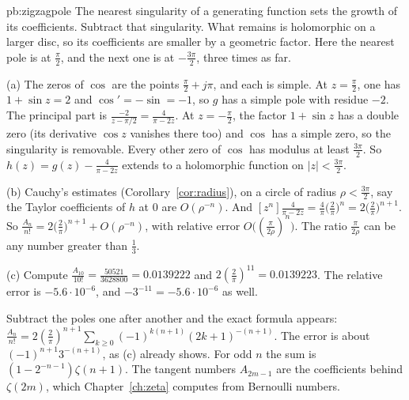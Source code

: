 \begin{solution}{pb:zigzagpole}
\idea The nearest singularity of a generating function sets the growth of its coefficients. Subtract that singularity. What remains is holomorphic on a larger disc, so its coefficients are smaller by a geometric factor. Here the nearest pole is at $\frac\pi2$, and the next one is at $-\frac{3\pi}2$, three times as far.

\writeup (a) The zeros of $\cos$ are the points $\frac\pi2+j\pi$, and each is simple. At $z=\frac\pi2$, one has $1+\sin z=2$ and $\cos'=-\sin=-1$, so $g$ has a simple pole with residue $-2$. The principal part is $\frac{-2}{z-\pi/2}=\frac4{\pi-2z}$. At $z=-\frac\pi2$, the factor $1+\sin z$ has a double zero (its derivative $\cos z$ vanishes there too) and $\cos$ has a simple zero, so the singularity is removable. Every other zero of $\cos$ has modulus at least $\frac{3\pi}2$. So $h(z)=g(z)-\frac4{\pi-2z}$ extends to a holomorphic function on $|z|<\frac{3\pi}2$.

(b) Cauchy's estimates (Corollary~\ref{cor:radius}), on a circle of radius $\rho<\frac{3\pi}2$, say the Taylor coefficients of $h$ at $0$ are $O(\rho^{-n})$. And $[z^n]\frac4{\pi-2z}=\frac4\pi\bigl(\frac2\pi\bigr)^n=2\bigl(\frac2\pi\bigr)^{n+1}$. So $\frac{A_n}{n!}=2\bigl(\frac2\pi\bigr)^{n+1}+O(\rho^{-n})$, with relative error $O\bigl((\frac\pi{2\rho})^n\bigr)$. The ratio $\frac\pi{2\rho}$ can be any number greater than $\frac13$.

(c) Compute $\frac{A_{10}}{10!}=\frac{50521}{3628800}=0.0139222$ and $2(\frac2\pi)^{11}=0.0139223$. The relative error is $-5.6\cdot10^{-6}$, and $-3^{-11}=-5.6\cdot10^{-6}$ as well.

\leads Subtract the poles one after another and the exact formula appears: $\frac{A_n}{n!}=2(\frac2\pi)^{n+1}\sum_{k\ge0}(-1)^{k(n+1)}(2k+1)^{-(n+1)}$. The error is about $(-1)^{n+1}3^{-(n+1)}$, as (c) already shows. For odd $n$ the sum is $(1-2^{-n-1})\zeta(n+1)$. The tangent numbers $A_{2m-1}$ are the coefficients behind $\zeta(2m)$, which Chapter~\ref{ch:zeta} computes from Bernoulli numbers.
\end{solution}

